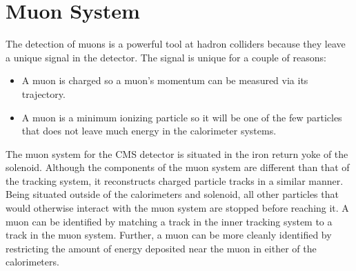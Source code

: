 \section{Muon System}
\label{sec:muonsystem}
The detection of muons is a powerful tool at hadron colliders because they leave a unique signal in the detector.
The signal is unique for a couple of reasons:
\begin{itemize}
\item A muon is charged so a muon's momentum can be measured via its trajectory.
\item A muon is a minimum ionizing particle so it will be one of the few particles that does not leave much energy in the calorimeter systems.
\end{itemize}
The muon system for the CMS detector is situated in the iron return yoke of the solenoid. 
Although the components of the muon system are different than that of the tracking system, it reconstructs charged particle tracks in a similar manner.
Being situated outside of the calorimeters and solenoid, all other particles that would otherwise interact with the muon system are stopped before reaching it.
A muon can be identified by matching a track in the inner tracking system to a track in the muon system.
Further, a muon can be more cleanly identified by restricting the amount of energy deposited near the muon in either of the calorimeters.

